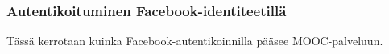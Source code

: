 \documentclass[finnish,gradu]{tktltiki}
\begin{document}


  \subsubsection{Autentikoituminen Facebook-identiteetillä} %
  \label{sub:autentikoituminen_oauth}
  Tässä kerrotaan kuinka Facebook-autentikoinnilla pääsee MOOC-palveluun.
\end{document}
